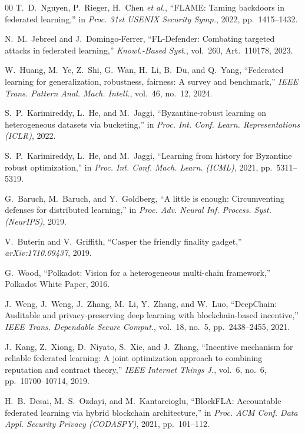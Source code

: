 \documentclass[conference]{IEEEtran}
\begin{document}
\begin{thebibliography}{00}
T.~D.~Nguyen, P.~Rieger, H.~Chen \textit{et al.},
``FLAME: Taming backdoors in federated learning,''
in \textit{Proc. 31st USENIX Security Symp.}, 2022, pp.~1415--1432.

N.~M.~Jebreel and J.~Domingo-Ferrer,
``FL-Defender: Combating targeted attacks in federated learning,''
\textit{Knowl.-Based Syst.}, vol.~260, Art.~110178, 2023.

W.~Huang, M.~Ye, Z.~Shi, G.~Wan, H.~Li, B.~Du, and Q.~Yang,
``Federated learning for generalization, robustness, fairness: A survey and benchmark,''
\textit{IEEE Trans. Pattern Anal. Mach. Intell.}, vol.~46, no.~12, 2024.

S.~P.~Karimireddy, L.~He, and M.~Jaggi,
``Byzantine-robust learning on heterogeneous datasets via bucketing,''
in \textit{Proc. Int. Conf. Learn. Representations (ICLR)}, 2022.

S.~P.~Karimireddy, L.~He, and M.~Jaggi,
``Learning from history for Byzantine robust optimization,''
in \textit{Proc. Int. Conf. Mach. Learn. (ICML)}, 2021, pp.~5311--5319.

G.~Baruch, M.~Baruch, and Y.~Goldberg,
``A little is enough: Circumventing defenses for distributed learning,''
in \textit{Proc. Adv. Neural Inf. Process. Syst. (NeurIPS)}, 2019.

V.~Buterin and V.~Griffith,
``Casper the friendly finality gadget,''
\textit{arXiv:1710.09437}, 2019.

G.~Wood,
``Polkadot: Vision for a heterogeneous multi-chain framework,''
Polkadot White Paper, 2016.

J.~Weng, J.~Weng, J.~Zhang, M.~Li, Y.~Zhang, and W.~Luo,
``DeepChain: Auditable and privacy-preserving deep learning with blockchain-based incentive,''
\textit{IEEE Trans. Dependable Secure Comput.}, vol.~18, no.~5, pp.~2438--2455, 2021.

J.~Kang, Z.~Xiong, D.~Niyato, S.~Xie, and J.~Zhang,
``Incentive mechanism for reliable federated learning: A joint optimization approach to combining reputation and contract theory,''
\textit{IEEE Internet Things J.}, vol.~6, no.~6, pp.~10700--10714, 2019.

H.~B.~Desai, M.~S.~Ozdayi, and M.~Kantarcioglu,
``BlockFLA: Accountable federated learning via hybrid blockchain architecture,''
in \textit{Proc. ACM Conf. Data Appl. Security Privacy (CODASPY)}, 2021, pp.~101--112.


\end{thebibliography}
\end{document}
